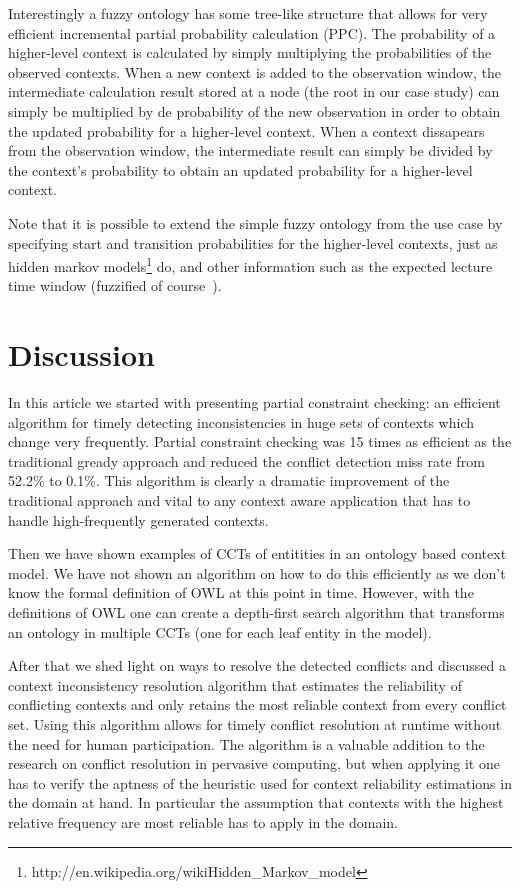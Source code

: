 \documentclass[journal]{vgtc}                %
\begin{document}
Interestingly a fuzzy ontology has some tree-like structure that allows for very efficient incremental partial probability calculation (PPC). The probability of a higher-level context is calculated by simply multiplying the probabilities of the observed contexts. When a new context is added to the observation window, the intermediate calculation result stored at a node (the root in our case study) can simply be multiplied by de probability of the new observation in order to obtain the updated probability for a higher-level context. When a context dissapears from the observation window, the intermediate result can simply be divided by the context's probability to obtain an updated probability for a higher-level context. 

Note that it is possible to extend the simple fuzzy ontology from the use case by specifying start and transition probabilities for the higher-level contexts, just as hidden markov models\footnote{http://en.wikipedia.org/wikiHidden\_Markov\_model} do, and other information such as the expected lecture time window (fuzzified of course~\cite{Buckley1995245}).

\section{Discussion}
In this article we started with presenting partial constraint checking: an efficient algorithm for timely detecting inconsistencies in huge sets of contexts which change very frequently. Partial constraint checking was 15 times as efficient as the traditional gready approach and reduced the conflict detection miss rate from 52.2\% to 0.1\%. This algorithm is clearly a dramatic improvement of the traditional approach and vital to any context aware application that has to handle high-frequently generated contexts.

Then we have shown examples of CCTs of entitities in an ontology based context model. We have not shown an algorithm on how to do this efficiently as we don't know the formal definition of OWL at this point in time. However, with the definitions of OWL one can create a depth-first search algorithm that transforms an ontology in multiple CCTs (one for each leaf entity in the model).

After that we shed light on ways to resolve the detected conflicts and discussed a context inconsistency resolution algorithm that estimates the reliability of conflicting contexts and only retains the most reliable context from every conflict set. Using this algorithm allows for timely conflict resolution at runtime without the need for human participation. The algorithm is a valuable addition to the research on conflict resolution in pervasive computing, but when applying it one has to verify the aptness of the heuristic used for context reliability estimations in the domain at hand. In particular the assumption that contexts with the highest relative frequency are most reliable has to apply in the domain.
\end{document}
